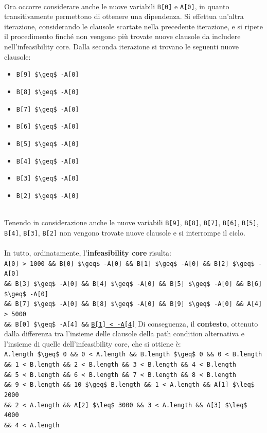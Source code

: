 \documentclass[a4paper, 12pt, oneside]{book}
\theoremstyle{normal}
\begin{document}
\noindent \\ Ora occorre considerare anche le nuove variabili \verb|B[0]| e \verb|A[0]|, in quanto transitivamente permettono di ottenere una dipendenza. Si effettua un'altra iterazione, considerando le clausole scartate nella precedente iterazione, e si ripete il procedimento finché non vengono più trovate nuove clausole da includere nell'infeasibility core. Dalla seconda iterazione si trovano le seguenti nuove clausole:
\begin{itemize}[itemsep=0pt, topsep=2pt]
    \item \lstinline|B[9] $\geq$ -A[0]|
    \item \lstinline|B[8] $\geq$ -A[0]|
    \item \lstinline|B[7] $\geq$ -A[0]|
    \item \lstinline|B[6] $\geq$ -A[0]|
    \item \lstinline|B[5] $\geq$ -A[0]|
    \item \lstinline|B[4] $\geq$ -A[0]|
    \item \lstinline|B[3] $\geq$ -A[0]|
    \item \lstinline|B[2] $\geq$ -A[0]|
\end{itemize}
\noindent \\ Tenendo in considerazione anche le nuove variabili \verb|B[9]|, \verb|B[8]|, \verb|B[7]|, \verb|B[6]|, \verb|B[5]|, \verb|B[4]|, \verb|B[3]|, \verb|B[2]| non vengono trovate nuove clausole e si interrompe il ciclo.
\noindent \\ \\ In tutto, ordinatamente, l'\textbf{infeasibility core} risulta: \\
\lstinline|A[0] > 1000 && B[0] $\geq$ -A[0] && B[1] $\geq$ -A[0] && B[2] $\geq$ -A[0]| \\
\lstinline|&& B[3] $\geq$ -A[0] && B[4] $\geq$ -A[0] && B[5] $\geq$ -A[0] && B[6] $\geq$ -A[0]| \\
\lstinline|&& B[7] $\geq$ -A[0] && B[8] $\geq$ -A[0] && B[9] $\geq$ -A[0] && A[4] > 5000| \\
\lstinline|&& B[0] $\geq$ -A[4] &&| \underline{\lstinline|B[1] < -A[4]|}
\clearpage \noindent Di conseguenza, il \textbf{contesto}, ottenuto dalla differenza tra l'insieme delle clausole della path condition alternativa e l'insieme di quelle dell'infeasibility core, che si ottiene è: \\
\lstinline|A.length $\geq$ 0 && 0 < A.length && B.length $\geq$ 0 && 0 < B.length| \\
\lstinline|&& 1 < B.length && 2 < B.length && 3 < B.length && 4 < B.length| \\
\lstinline|&& 5 < B.length && 6 < B.length && 7 < B.length && 8 < B.length| \\
\lstinline|&& 9 < B.length && 10 $\geq$ B.length && 1 < A.length && A[1] $\leq$ 2000| \\ \lstinline|&& 2 < A.length && A[2] $\leq$ 3000 && 3 < A.length && A[3] $\leq$ 4000| \\
\lstinline|&& 4 < A.length|
\end{document}

